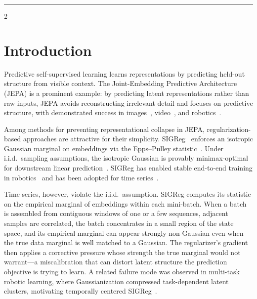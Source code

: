 \documentclass[10pt]{article}
\theoremstyle{remark}
\begin{document}
	\vspace{1mm}
    \begin{center}
        \rule{150mm}{0.2mm}
    \end{center}
    \vspace{3mm}

\begin{multicols*}{2}

\section{Introduction}

Predictive self-supervised learning learns representations by predicting held-out structure from visible context. The Joint-Embedding Predictive Architecture (JEPA) is a prominent example: by predicting latent representations rather than raw inputs, JEPA avoids reconstructing irrelevant detail and focuses on predictive structure, with demonstrated success in images~\cite{assran2023ijepa}, video~\cite{bardes2024vjepa}, and robotics~\cite{maes2026lewm}.

Among methods for preventing representational collapse in JEPA, regularization-based approaches are attractive for their simplicity. SIGReg~\cite{balestriero2025lejepa} enforces an isotropic Gaussian marginal on embeddings via the Epps--Pulley statistic~\cite{epps1983epps}. Under i.i.d.\ sampling assumptions, the isotropic Gaussian is provably minimax-optimal for downstream linear prediction~\cite{balestriero2025lejepa}. SIGReg has enabled stable end-to-end training in robotics~\cite{maes2026lewm} and has been adopted for time series~\cite{petersen2026hepa}.

Time series, however, violate the i.i.d.\ assumption. SIGReg computes its statistic on the empirical marginal of embeddings within each mini-batch. When a batch is assembled from contiguous windows of one or a few sequences, adjacent samples are correlated, the batch concentrates in a small region of the state space, and its empirical marginal can appear strongly non-Gaussian even when the true data marginal is well matched to a Gaussian. The regularizer's gradient then applies a corrective pressure whose strength the true marginal would not warrant---a miscalibration that can distort latent structure the prediction objective is trying to learn. A related failure mode was observed in multi-task robotic learning, where Gaussianization compressed task-dependent latent clusters, motivating temporally centered SIGReg~\cite{liu2026tclwm}.


\end{multicols*}
\end{document}
